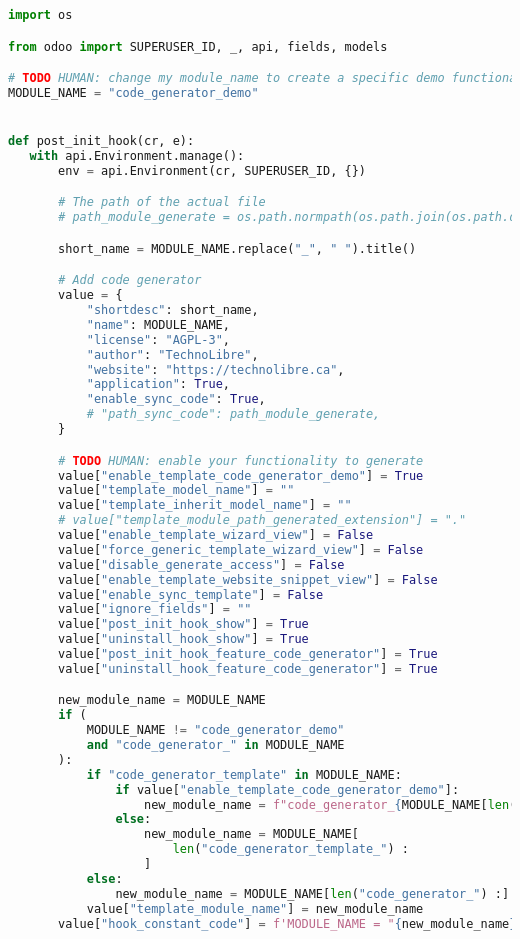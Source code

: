 \begin{lstlisting}[language=Python, upquote=true]
import os

from odoo import SUPERUSER_ID, _, api, fields, models

# TODO HUMAN: change my module_name to create a specific demo functionality
MODULE_NAME = "code_generator_demo"


def post_init_hook(cr, e):
   with api.Environment.manage():
       env = api.Environment(cr, SUPERUSER_ID, {})

       # The path of the actual file
       # path_module_generate = os.path.normpath(os.path.join(os.path.dirname(__file__), '..'))

       short_name = MODULE_NAME.replace("_", " ").title()

       # Add code generator
       value = {
           "shortdesc": short_name,
           "name": MODULE_NAME,
           "license": "AGPL-3",
           "author": "TechnoLibre",
           "website": "https://technolibre.ca",
           "application": True,
           "enable_sync_code": True,
           # "path_sync_code": path_module_generate,
       }

       # TODO HUMAN: enable your functionality to generate
       value["enable_template_code_generator_demo"] = True
       value["template_model_name"] = ""
       value["template_inherit_model_name"] = ""
       # value["template_module_path_generated_extension"] = "."
       value["enable_template_wizard_view"] = False
       value["force_generic_template_wizard_view"] = False
       value["disable_generate_access"] = False
       value["enable_template_website_snippet_view"] = False
       value["enable_sync_template"] = False
       value["ignore_fields"] = ""
       value["post_init_hook_show"] = True
       value["uninstall_hook_show"] = True
       value["post_init_hook_feature_code_generator"] = True
       value["uninstall_hook_feature_code_generator"] = True

       new_module_name = MODULE_NAME
       if (
           MODULE_NAME != "code_generator_demo"
           and "code_generator_" in MODULE_NAME
       ):
           if "code_generator_template" in MODULE_NAME:
               if value["enable_template_code_generator_demo"]:
                   new_module_name = f"code_generator_{MODULE_NAME[len('code_generator_template_'):]}"
               else:
                   new_module_name = MODULE_NAME[
                       len("code_generator_template_") :
                   ]
           else:
               new_module_name = MODULE_NAME[len("code_generator_") :]
           value["template_module_name"] = new_module_name
       value["hook_constant_code"] = f'MODULE_NAME = "{new_module_name}"'


\end{lstlisting}
